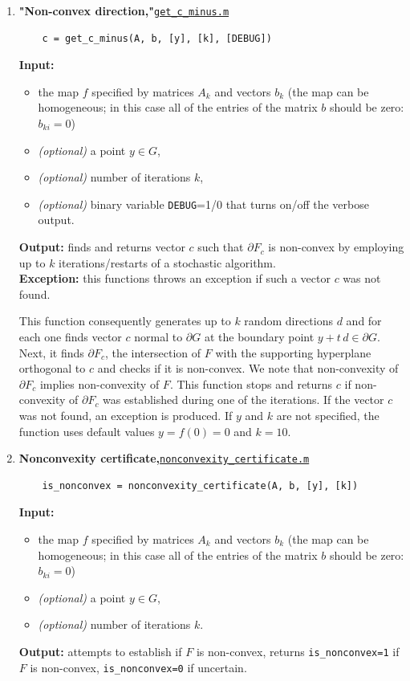 \documentclass[a4paper]{article}
\theoremstyle{definition}
\begin{document}
\begin{enumerate}

\item {\bf "Non-convex direction,"\hskip 6pt}\underline{\tt  get\_c\_minus.m} 
	\begin{verbatim}
	c = get_c_minus(A, b, [y], [k], [DEBUG])
	\end{verbatim}
{\bf Input:}
\begin{itemize}
	\item the map $f$ specified by matrices $A_k$ and vectors $b_k$ (the map can be homogeneous; in this case all of the entries of the matrix $b$ should be zero: $b_{ki}=0$)
	\item {\it (optional)} a point $y\in G$,
	\item {\it (optional)} number of iterations $k$,
	\item {\it (optional)} binary variable {\tt DEBUG}=1/0 that turns on/off the verbose output.
\end{itemize}
{\bf Output:}  finds and returns vector $c$ such that $\partial F_c$ is non-convex by employing up to $k$ iterations/restarts of a stochastic algorithm.\\
{\bf Exception:} this functions throws an exception if such a vector $c$ was not found.

This function consequently generates up to $k$ random directions $d$ and for each one finds vector $c$ normal to $\partial G$ at the boundary point $y+t\, d\in \partial G$.
Next, it finds $\partial F_c$, the intersection of $F$ with the supporting hyperplane orthogonal to $c$ and checks if it is non-convex.
We note that non-convexity of $\partial F_c$ implies non-convexity of $F$.
This function stops and returns $c$ if non-convexity of $\partial F_c$ was established during one of the iterations. If the vector $c$ was not found, an exception is produced.
If $y$ and $k$ are not specified, the function uses default values $y=f(0)=0$ and $k=10$.


\item {\bf Nonconvexity certificate,\hskip 6pt}\underline{\tt  nonconvexity\_certificate.m} 
	\begin{verbatim}
	is_nonconvex = nonconvexity_certificate(A, b, [y], [k])
	\end{verbatim}
{\bf Input:}
\begin{itemize}
	\item the map $f$ specified by matrices $A_k$ and vectors $b_k$ (the map can be homogeneous; in this case all of the entries of the matrix $b$ should be zero: $b_{ki}=0$)
	\item {\it (optional)} a point $y\in G$,
	\item {\it (optional)} number of iterations $k$.
\end{itemize}
{\bf Output:} attempts to establish if $F$ is non-convex, returns {\tt is\_nonconvex=1} if $F$ is non-convex,  {\tt is\_nonconvex=0} if uncertain.\\


\end{enumerate}
\end{document}
